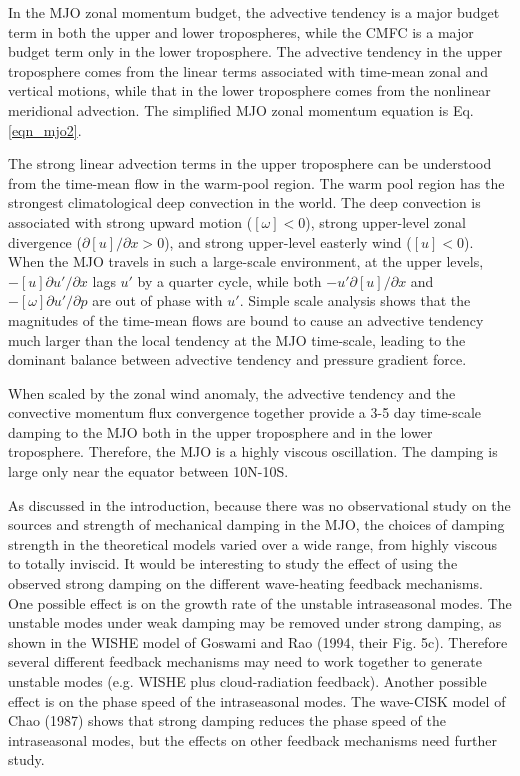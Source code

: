\documentclass[12pt]{article}
\begin{document}
In the MJO zonal momentum budget, the advective tendency is a major budget
term in both the upper and lower tropospheres, while the CMFC
is a major budget term only in the lower troposphere.
The advective tendency in the upper troposphere comes from the linear
terms associated with time-mean zonal and vertical motions, while that
in the lower troposphere comes from the nonlinear meridional advection.
The simplified MJO zonal momentum equation is Eq. \ref{eqn_mjo2}.

The strong linear advection terms in the upper troposphere can be understood
from the time-mean flow in the warm-pool region.
The warm pool region has the strongest
climatological deep convection in the world. The deep convection is
associated with strong upward motion ($[\omega]<0$), 
strong upper-level zonal divergence
($\partial [u]/ \partial x >0$), and strong upper-level easterly wind
($[u] < 0$).
When the MJO travels in such a large-scale environment, at the upper levels,
$-[u] \partial u'/ \partial x$ lags $u'$ by a quarter cycle, while
both $-u' \partial [u]/ \partial x$ and $-[\omega] \partial u'/ \partial p$
are out of phase with $u'$.
Simple scale analysis shows that the magnitudes of the time-mean flows
are bound to cause an advective tendency much larger than the local
tendency at the MJO time-scale, leading to the dominant balance between
advective tendency and pressure gradient force.

When scaled by the zonal wind anomaly, the advective tendency and the
convective momentum flux convergence together provide 
a 3-5 day time-scale damping to the MJO
both in the upper troposphere and in the lower
troposphere.
Therefore, the MJO is a highly viscous oscillation.
The damping is large only near the equator between 10N-10S.

As discussed in the introduction, 
because there was no observational study on the sources and strength
of mechanical damping in the MJO,
the choices of damping strength in the theoretical models varied over a
wide range, from highly viscous to totally inviscid.
It would be interesting to study the effect of 
using the observed strong damping on
the different wave-heating feedback mechanisms.
One possible effect is on the growth rate of the unstable intraseasonal modes.
The unstable modes under weak damping
may be removed under strong damping, as shown in the WISHE model of
Goswami and Rao (1994, their Fig. 5c).
Therefore several different feedback mechanisms may need to work together 
to generate unstable modes
(e.g. WISHE plus cloud-radiation feedback). 
Another possible effect is on the phase speed of the intraseasonal modes.
The wave-CISK model of Chao (1987) shows that
strong damping reduces the phase speed
of the intraseasonal modes, 
but the effects on other feedback mechanisms need further study.
\end{document}
